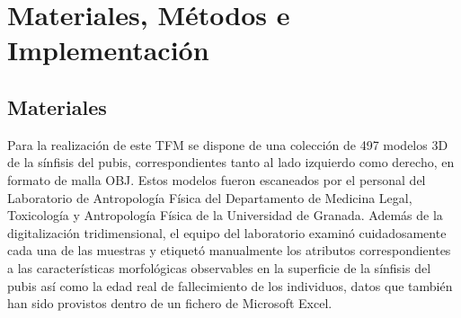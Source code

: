 \chapter{Materiales, Métodos e Implementación}

\section{Materiales}
\label{section4:materials}
Para la realización de este TFM se dispone de una colección de 497 modelos 3D de la sínfisis del pubis, correspondientes tanto al lado izquierdo como derecho, en formato de malla OBJ. Estos modelos fueron escaneados por el personal del Laboratorio de Antropología Física del Departamento de Medicina Legal, Toxicología y Antropología Física de la Universidad de Granada. Además de la digitalización tridimensional, el equipo del laboratorio examinó cuidadosamente cada una de las muestras y etiquetó manualmente los atributos correspondientes a las características morfológicas observables en la superficie de la sínfisis del pubis así como la edad real de fallecimiento de los individuos, datos que también han sido provistos dentro de un fichero de Microsoft Excel.

